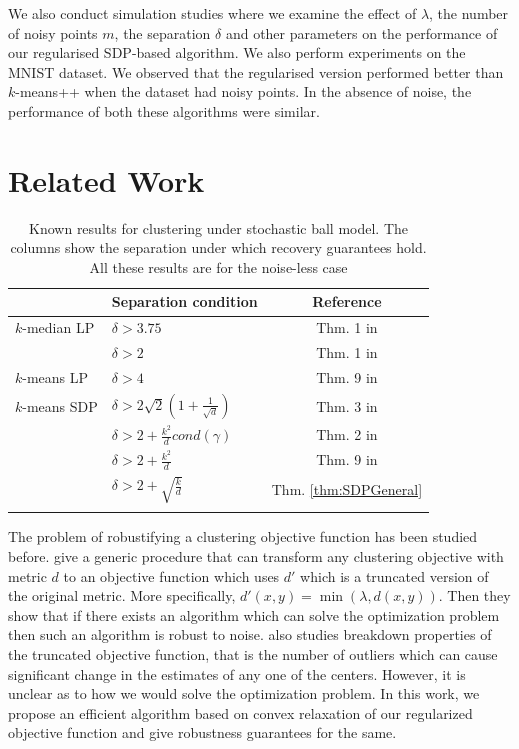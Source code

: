 \documentclass[12pt]{article}
\begin{document}
We also conduct simulation studies where we examine the effect of $\lambda$, the number of noisy points $m$, the separation $\delta$ and other parameters on the performance of our regularised SDP-based algorithm. We also perform experiments on the MNIST dataset. We observed that the regularised version performed better than $k$-means++ when the dataset had noisy points. In the absence of noise, the performance of both these algorithms were similar. 

\section{Related Work}
\begin{table}
\centering
\caption{Known results for clustering under stochastic ball model. The columns show the separation under which recovery guarantees hold. All these results are for the noise-less case}

\label{table:stochasticBall}
\setlength{\tabcolsep}{0.5em} 
{\renewcommand{\arraystretch}{1.2}%
\begin{tabular}{llc}
\\
 & Separation condition & Reference\\
 \hline
$k$-median LP & $\delta > 3.75$ & Thm. 1 in \cite{nellore2015recovery}\\
 & $\delta > 2$ & Thm. 1 in \cite{awasthi2015relax}\\
\hline
$k$-means LP & $\delta > 4$ & Thm. 9 in \cite{nellore2015recovery}\\
\hline
$k$-means SDP & $\delta > 2\sqrt2 (1 + \frac{1}{\sqrt d})$ & Thm. 3 in \cite{awasthi2015relax}\\
 & $\delta > 2 + \frac{k^2}{d}cond(\gamma)$ & Thm. 2 in \cite{iguchi2015tightness}\\
 & $\delta > 2 + \frac{k^2}{d}$ & Thm. 9 in \cite{iguchi2017probably}\\
 & $\delta > 2 + \sqrt{\frac{k}{d}}$ & Thm. \ref {thm:SDPGeneral}\\
\hline


\label{table:alphacenter}
\end{tabular}
}
\end{table}
The problem of robustifying a clustering objective function has been studied before. \cite{ben2014clustering} give a generic procedure that can transform any clustering objective with metric $d$ to an objective function which uses $d'$ which is a truncated version of the original metric. More specifically, $d'(x, y) = \min (\lambda,   d(x,y)).$ Then they show that if there exists an algorithm which can solve the optimization problem then such an algorithm is robust to noise. \cite{georgogiannis2016robust}  also studies breakdown properties of the truncated objective function, that is the number of outliers which can cause significant change in the estimates of any one of the centers. However, it is unclear as to how we would solve the optimization problem. In this work, we propose an efficient algorithm based on convex relaxation of our regularized objective function and give robustness guarantees for the same. 
\end{document}
